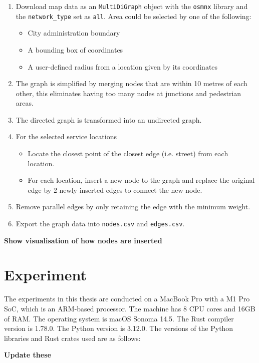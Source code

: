 \begin{enumerate}
    \item Download map data as an \verb|MultiDiGraph| object with the \verb|osmnx| library and the \verb|network_type| set as \verb|all|. Area could be selected by one of the following:
    \begin{itemize}
        \item City administration boundary
        \item A bounding box of coordinates
        \item A user-defined radius from a location given by its coordinates
    \end{itemize}
    \item The graph is simplified by merging nodes that are within 10 metres of each other, this eliminates having too many nodes at junctions and pedestrian areas.
    \item The directed graph is transformed into an undirected graph.
    \item For the selected service locations
    \begin{itemize}
        \item Locate the closest point of the closest edge (i.e. street) from each location.
        \item For each location, insert a new node to the graph and replace the original edge by 2 newly inserted edges to connect the new node.
    \end{itemize}
    \item Remove parallel edges by only retaining the edge with the minimum weight.
    \item Export the graph data into \verb|nodes.csv| and \verb|edges.csv|.
\end{enumerate}

\textbf{Show visualisation of how nodes are inserted}

\section{Experiment} \label{padua}

The experiments in this thesis are conducted on a MacBook Pro with a M1 Pro SoC, which is an ARM-based processor. The machine has 8 CPU cores and 16GB of RAM. The operating system is macOS Sonoma 14.5. The Rust compiler version is 1.78.0. The Python version is 3.12.0. The versions of the Python libraries and Rust crates used are as follows:

\textbf{Update these}

